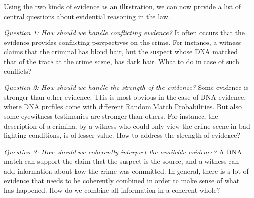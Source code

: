\documentclass[10pt]{article}
\begin{document}
Using the two kinds of evidence as an illustration, we can now provide 
a list of central questions about evidential reasoning in the law. 

\textit{Question 1:	How should we handle conflicting evidence?}
It often occurs that the evidence provides conflicting perspectives on the crime. For instance, a witness claims that the criminal has blond hair, 
but the suspect whose DNA matched that of the trace at the crime scene, has dark hair. What to do in case of such conflicts? 

\textit{Question 2:	How should we handle the strength of the evidence?}
Some evidence is stronger than other evidence. This is most obvious in the case of DNA evidence, where DNA profiles come with different Random Match Probabilities. But also some eyewitness testimonies are stronger than others. For instance, the description of a criminal by a witness who could only view the crime scene in bad lighting conditions, is of lesser value. How to address the strength of evidence?

\textit{Question 3:	How should we coherently interpret the available evidence?}
A DNA match can support the claim that the suspect is the source, and a witness can add information about how the crime was committed. In general, there is a lot of evidence that needs to be coherently combined in order to make sense of what has happened. How do we combine all information in a coherent whole?

\end{document}
